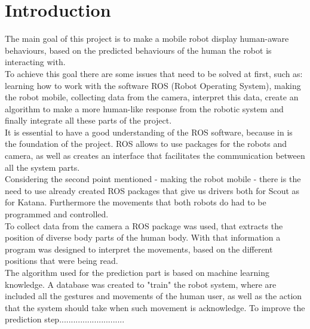 
\section{Introduction}
The main goal of this project is to make a mobile robot display human-aware behaviours, based on the predicted behaviours of the human the robot is interacting with.\\

To achieve this goal there are some issues that need to be solved at first, such as: learning how to work with the software ROS (Robot Operating System), making the robot mobile, collecting data from the camera, interpret this data, create an algorithm to make a more human-like response from the robotic system and finally integrate all these parts of the project.\\

It is essential to have a good understanding of the ROS software, because in is the foundation of the project. ROS allows to use packages for the robots and camera, as well as creates an interface that facilitates the communication between all the system parts.\\

Considering the second point mentioned - making the robot mobile - there is the need to use already created ROS packages that give us drivers both for Scout as for Katana. Furthermore the movements that both robots do had to be programmed and controlled.\\

To collect data from the camera a ROS package was used, that extracts the position of diverse body parts of the human body. With that information a program was designed to interpret the movements, based on the different positions that were being read.\\

The algorithm used for the prediction part is based on machine learning knowledge. A database was created to "train" the robot system, where are included all the gestures and movements of the human user, as well as the action that the system should take when such movement is acknowledge. To improve the prediction step............................
